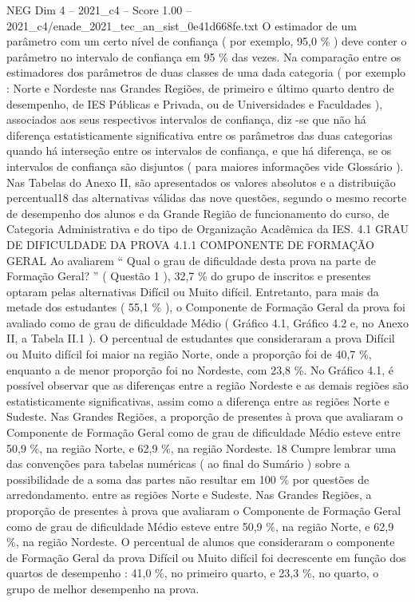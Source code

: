 \begin{textsample}{NEG Dim 4 – 2021\_c4 – Score 1.00 – 2021\_c4/enade\_2021\_tec\_an\_sist\_0e41d668fe.txt}
O estimador de um parâmetro com um certo nível de confiança ( por exemplo, 95,0 \% ) deve conter o parâmetro no intervalo de confiança em 95 \% das vezes.
Na comparação entre os estimadores dos parâmetros de duas classes de uma dada categoria ( por exemplo : Norte e Nordeste nas Grandes Regiões, de primeiro e último quarto dentro de desempenho, de IES Públicas e Privada, ou de Universidades e Faculdades ), associados aos seus respectivos intervalos de confiança, diz -se que não há diferença estatisticamente significativa entre os parâmetros das duas categorias quando há interseção entre os intervalos de confiança, e que há diferença, se os intervalos de confiança são disjuntos ( para maiores informações vide Glossário ).
Nas Tabelas do Anexo II, são apresentados os valores absolutos e a distribuição percentual18 das alternativas válidas das nove questões, segundo o mesmo recorte de desempenho dos alunos e da Grande Região de funcionamento do curso, de Categoria Administrativa e do tipo de Organização Acadêmica da IES. 4.1 GRAU DE DIFICULDADE DA PROVA 4.1.1 COMPONENTE DE FORMAÇÃO GERAL Ao avaliarem “ Qual o grau de dificuldade desta prova na parte de Formação Geral? ” ( Questão 1 ), 32,7 \% do grupo de inscritos e presentes optaram pelas alternativas Difícil ou Muito difícil.
Entretanto, para mais da metade dos estudantes ( 55,1 \% ), o Componente de Formação Geral da prova foi avaliado como de grau de dificuldade Médio ( Gráfico 4.1, Gráfico 4.2 e, no Anexo II, a Tabela II.1 ).
O percentual de estudantes que consideraram a prova Difícil ou Muito difícil foi maior na região Norte, onde a proporção foi de 40,7 \%, enquanto a de menor proporção foi no Nordeste, com 23,8 \%.
No Gráfico 4.1, é possível observar que as diferenças entre a região Nordeste e as demais regiões são estatisticamente significativas, assim como a diferença entre as regiões Norte e Sudeste.
Nas Grandes Regiões, a proporção de presentes à prova que avaliaram o Componente de Formação Geral como de grau de dificuldade Médio esteve entre 50,9 \%, na região Norte, e 62,9 \%, na região Nordeste. 18 Cumpre lembrar uma das convenções para tabelas numéricas ( ao final do Sumário ) sobre a possibilidade de a soma das partes não resultar em 100 \% por questões de arredondamento. entre as regiões Norte e Sudeste.
Nas Grandes Regiões, a proporção de presentes à prova que avaliaram o Componente de Formação Geral como de grau de dificuldade Médio esteve entre 50,9 \%, na região Norte, e 62,9 \%, na região Nordeste.
O percentual de alunos que consideraram o componente de Formação Geral da prova Difícil ou Muito difícil foi decrescente em função dos quartos de desempenho : 41,0 \%, no primeiro quarto, e 23,3 \%, no quarto, o grupo de melhor desempenho na prova.

\end{textsample}
